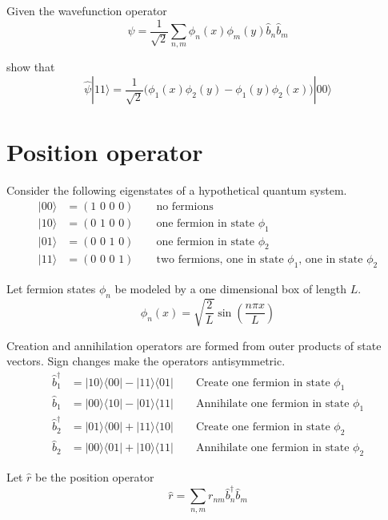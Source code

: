 \documentclass[12pt]{article}
\begin{document}
\noindent
Given the wavefunction operator
\begin{equation*}
\hat{\psi}=\frac{1}{\sqrt{2}}\sum_{n,m}\phi_n(x)\phi_m(y)\hat{b}_n\hat{b}_m
\end{equation*}

\noindent
show that
\begin{equation*}
\hat{\psi}|11\rangle=\frac{1}{\sqrt{2}}\big(\phi_1(x)\phi_2(y)-\phi_1(y)\phi_2(x)\big)|00\rangle
\end{equation*}

\newpage

\section{Position operator}
Consider the following eigenstates of a hypothetical quantum system.
\begin{align*}
|00\rangle&=(\text{1 0 0 0})\qquad\text{no fermions}\\
|10\rangle&=(\text{0 1 0 0})\qquad\text{one fermion in state $\phi_1$}\\
|01\rangle&=(\text{0 0 1 0})\qquad\text{one fermion in state $\phi_2$}\\
|11\rangle&=(\text{0 0 0 1})\qquad\text{two fermions, one in state $\phi_1$, one in state $\phi_2$}
\end{align*}

\noindent
Let fermion states $\phi_n$ be modeled by a one dimensional box of length $L$.
\begin{equation*}
\phi_n(x)=\sqrt{\frac{2}{L}}\sin\left(\frac{n\pi x}{L}\right)
\end{equation*}

\noindent
Creation and annihilation operators are formed from outer products of state vectors.
Sign changes make the operators antisymmetric.
\begin{align*}
\hat{b}_1^\dag&=|10\rangle\langle00|-|11\rangle\langle01| \qquad\text{Create one fermion in state $\phi_1$}
\\
\hat{b}_1&=|00\rangle\langle10|-|01\rangle\langle11| \qquad\text{Annihilate one fermion in state $\phi_1$}
\\
\hat{b}_2^\dag&=|01\rangle\langle00|+|11\rangle\langle10| \qquad\text{Create one fermion in state $\phi_2$}
\\
\hat{b}_2&=|00\rangle\langle01|+|10\rangle\langle11| \qquad\text{Annihilate one fermion in state $\phi_2$}
\end{align*}

\noindent
Let $\hat{r}$ be the position operator
\begin{equation*}
\hat{r}=\sum_{n,m}r_{nm}\hat{b}_n^\dag\hat{b}_m
\end{equation*}
\end{document}
